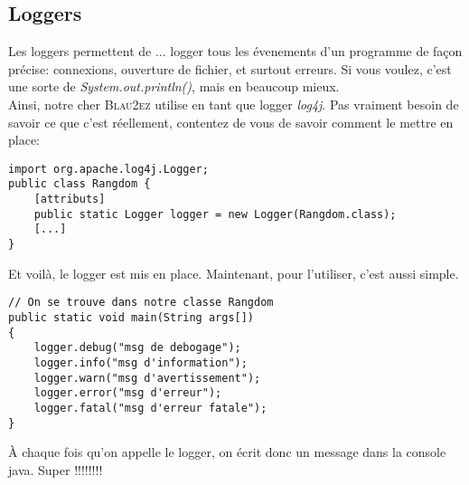 \documentclass{article}
\begin{document}
\subsection{Loggers}
Les loggers permettent de ... logger tous les évenements d'un programme de façon précise: connexions, ouverture de fichier, et surtout erreurs. Si vous voulez, c'est une sorte de \emph{System.out.println()}, mais en beaucoup mieux.\\
Ainsi, notre cher \textsc{Blau2ez} utilise en tant que logger \emph{log4j}. Pas vraiment besoin de savoir ce que c'est réellement, contentez de vous de savoir comment le mettre en place:
\begin{lstlisting}
import org.apache.log4j.Logger;
public class Rangdom {
	[attributs]
	public static Logger logger = new Logger(Rangdom.class);
	[...]
}
\end{lstlisting}
Et voilà, le logger est mis en place. Maintenant, pour l'utiliser, c'est aussi simple.
\begin{lstlisting}
// On se trouve dans notre classe Rangdom
public static void main(String args[])
{
	logger.debug("msg de debogage");
	logger.info("msg d'information");
	logger.warn("msg d'avertissement");
	logger.error("msg d'erreur");
	logger.fatal("msg d'erreur fatale");   
}
\end{lstlisting}
À chaque fois qu'on appelle le logger, on écrit donc un message dans la console java. Super !!!!!!!!	
\end{document}
